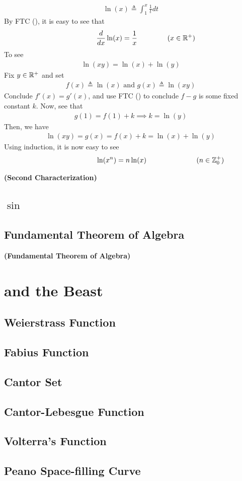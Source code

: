 \documentclass{report}
\begin{document}
\begin{mdframed}
\begin{align*}
\ln (x)\triangleq \int_1^x \frac{1}{t}dt
\end{align*}
By FTC (), it is easy to see that 
 \begin{align*}
\hspace{1.5cm}\frac{d}{dx}\ln (x)=\frac{1}{x}\hspace{1.5cm}(x\in\mathbb{R}^+)
\end{align*}
To see 
\begin{align*}
\ln (xy)=\ln (x)+ \ln (y)
\end{align*}
Fix $y\in\mathbb{R}^+$ and set 
\begin{align*}
f(x)\triangleq \ln (x)\text{ and }g(x)\triangleq \ln(xy)
\end{align*}
Conclude $f'(x)=g'(x)$, and use FTC () to conclude $f-g$ is some fixed constant $k$. Now, see that 
\begin{align*}
g(1)=f(1)+k \implies k=\ln(y)
\end{align*}
Then, we have 
\begin{align*}
\ln(xy)=g(x)=f(x)+k=\ln (x)+ \ln (y)
\end{align*}
Using induction, it is now easy to see 
\begin{align*}
  \hspace{3cm}\ln (x^n)=n \ln (x)\hspace{2.5cm}(n\inz_0^+)
\end{align*}
\end{mdframed}
\begin{theorem}
\textbf{(Second Characterization)}
\end{theorem}
\section{$\sin$}
\section{Fundamental Theorem of Algebra}
\begin{theorem}
\textbf{(Fundamental Theorem of Algebra)}
\end{theorem}


\chapter{and the Beast}
\section{Weierstrass Function}
\section{Fabius Function}

\section{Cantor Set}
\section{Cantor-Lebesgue Function}
\section{Volterra's Function}
\section{Peano Space-filling Curve}
\end{document}
